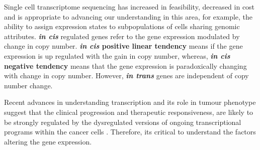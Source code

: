 Single cell transcriptome sequencing has increased in feasibility, decreased in cost and is appropriate to advancing our understanding in this area, for example, the ability to assign expression states to subpopulations of cells sharing genomic attributes. \textbf{\textit{in cis}} regulated genes refer to the gene expression modulated by change in copy number. \textbf{{\textit{in cis} positive linear tendency}} means if the gene expression is up regulated with the gain in copy number, whereas, \textbf{{\textit{in cis} negative tendency}} means that the gene expression is paradoxically changing with change in copy number. However, \textbf{\textit{in trans}} genes are independent of copy number change.

Recent advances in understanding transcription and its role in tumour phenotype suggest that the clinical progression and therapeutic responsiveness, are likely to be strongly regulated by the dysregulated versions of ongoing transcriptional programs within the cancer cells \cite{lawrence2014discovery, sur2016role}. Therefore, its critical to understand the factors altering the gene expression.

